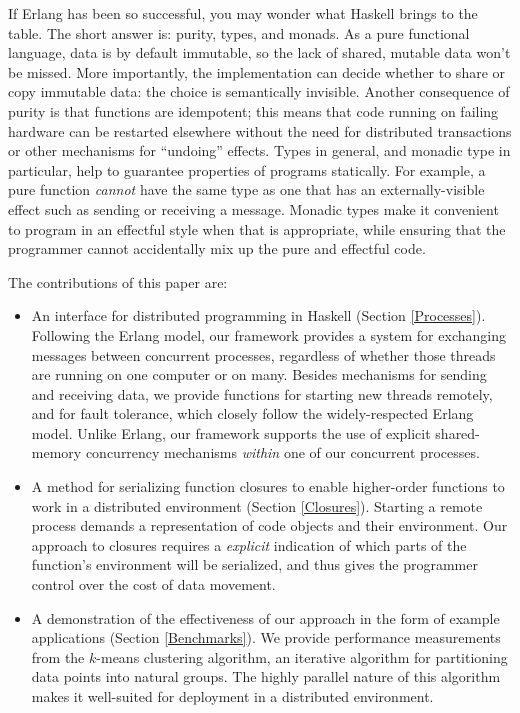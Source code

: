 \documentclass[preprint]{sigplanconf}
\begin{document}
If Erlang has been so successful, you may wonder what Haskell brings to the table. 
The short answer is: purity, types, and monads.  As a pure functional language, data is by default immutable, so the lack of shared, mutable data won't be missed.  More importantly, the implementation can decide whether to share or copy immutable data: the choice is semantically invisible. Another consequence of purity is that functions are idempotent; this means that code running on failing hardware can be restarted elsewhere without the need for distributed transactions or other mechanisms for ``undoing'' effects.  
Types in general, and monadic type in particular, help to guarantee properties of programs statically.  
For example, a pure function \emph{cannot} have the same type as one that has an externally-visible effect such as sending or receiving a message.  
Monadic types make it convenient to program in an effectful style when that is appropriate, while ensuring that the programmer cannot accidentally mix up the pure and effectful code.

The contributions of this paper are:
\begin{itemize}
\item An interface for distributed programming in Haskell (Section \ref{Processes}). Following the Erlang model, our framework provides a system for exchanging messages between concurrent processes, regardless of whether those threads are running on one computer or on many. Besides mechanisms for sending and receiving data, we provide functions for starting new threads remotely, and for fault tolerance, which closely follow the widely-respected Erlang model. Unlike Erlang, our framework supports the use of explicit shared-memory concurrency mechanisms \emph{within} one of our concurrent processes.

\item A method for serializing function closures to enable higher-order functions to work in a distributed environment (Section \ref{Closures}). Starting a remote process demands a representation of code objects and their environment. Our approach to closures requires a \emph{explicit} indication of which parts of the function's environment will be serialized, and thus gives the programmer control over the cost of data movement.

\item A demonstration of the effectiveness of our approach in the form of example applications (Section \ref{Benchmarks}). We provide performance measurements from the $k$-means clustering algorithm, an iterative algorithm for partitioning data points into natural groups. The highly parallel nature of this algorithm makes it well-suited for deployment in a distributed environment.
\end{itemize}
\end{document}

